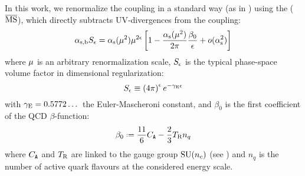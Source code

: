 In this work, we renormalize the coupling in a standard way (as in \cite{Catani-1998}) using the  ($ \overline{\text{MS}} $), which directly subtracts UV-divergences from the coupling:
\begin{equation}
  \alpha_\text{s,b} S_\epsilon = \alpha_\text{s}(\mu^2) \mu^{2\epsilon} \left[ 1 - \frac{\alpha_\text{s}(\mu^2)}{2\pi} \frac{\beta_0}{\epsilon} + o(\alpha_\text{s}^2) \right]
  \label{eq:msb-def}
\end{equation}
where $ \mu $ is an arbitrary renormalization scale, $ S_\epsilon $ is the typical phase-space volume factor in dimensional regularization:
\begin{equation}
  S_\epsilon \equiv \left( 4\pi \right)^\epsilon e^{-\gamma_\text{E} \epsilon}
\end{equation}
with $ \gamma_\text{E} = 0.5772\dots $ the Euler-Mascheroni constant, and $ \beta_0 $ is the first coefficient of the QCD $ \beta $-function:
\begin{equation}
  \beta_0 \defeq \frac{11}{6} \caa - \frac{2}{3} \ttr n_q
\end{equation}
where $ C_\mathtt{A} $ and $ T_\text{R} $ are linked to the gauge group $ \mathrm{SU}(n_c) $ (see )  and $ n_q $ is the number of active quark flavours at the considered energy scale\footnotemark.


